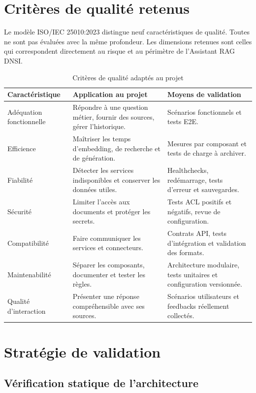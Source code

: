 \section{Critères de qualité retenus}

Le modèle ISO/IEC 25010:2023 distingue neuf caractéristiques de qualité. Toutes ne sont pas évaluées avec la même profondeur. Les dimensions retenues sont celles qui correspondent directement au risque et au périmètre de l'Assistant RAG DNSI.

\begin{table}[H]
\centering
\caption{Critères de qualité adaptés au projet}
\label{tab:criteres_qualite}
\begin{tabular}{p{3.1cm}p{5.1cm}p{5cm}}
\toprule
\textbf{Caractéristique} & \textbf{Application au projet} & \textbf{Moyens de validation} \\
\midrule
Adéquation fonctionnelle & Répondre à une question métier, fournir des sources, gérer l'historique. & Scénarios fonctionnels et tests E2E. \\
Efficience & Maîtriser les temps d'embedding, de recherche et de génération. & Mesures par composant et tests de charge à archiver. \\
Fiabilité & Détecter les services indisponibles et conserver les données utiles. & Healthchecks, redémarrage, tests d'erreur et sauvegardes. \\
Sécurité & Limiter l'accès aux documents et protéger les secrets. & Tests ACL positifs et négatifs, revue de configuration. \\
Compatibilité & Faire communiquer les services et connecteurs. & Contrats API, tests d'intégration et validation des formats. \\
Maintenabilité & Séparer les composants, documenter et tester les règles. & Architecture modulaire, tests unitaires et configuration versionnée. \\
Qualité d'interaction & Présenter une réponse compréhensible avec ses sources. & Scénarios utilisateurs et feedbacks réellement collectés. \\
\bottomrule
\end{tabular}
\end{table}

\section{Stratégie de validation}

\subsection{Vérification statique de l'architecture}

